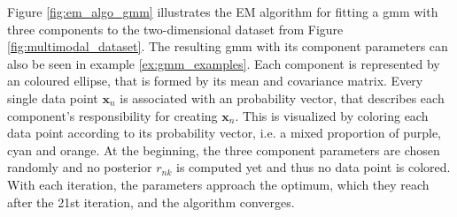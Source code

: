 
Figure \ref{fig:em_algo_gmm} illustrates the EM algorithm for fitting a \acrshort{gmm} with three components to the two-dimensional dataset from Figure \ref{fig:multimodal_dataset}. The resulting \acrshort{gmm} with its component parameters can also be seen in example \ref{ex:gmm_examples}. Each component is represented by an coloured ellipse, that is formed by its mean and covariance matrix. Every single data point $\bm{x}_n$ is associated with an probability vector, that describes each component's responsibility for creating $\bm{x}_n$. This is visualized by coloring each data point according to its probability vector, i.e. a mixed proportion of purple, cyan and orange. At the beginning, the three component parameters are chosen randomly and no posterior $r_{nk}$ is computed yet and thus no data point is colored. With each iteration, the parameters approach the optimum, which they reach after the 21st iteration, and the algorithm converges.


